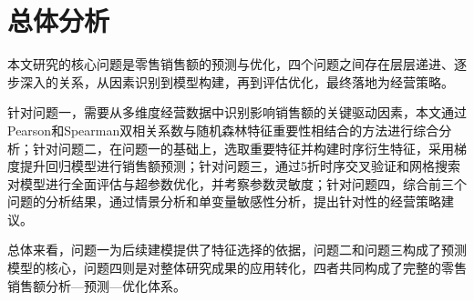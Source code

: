 
\section{总体分析}

本文研究的核心问题是零售销售额的预测与优化，四个问题之间存在层层递进、逐步深入的关系，从因素识别到模型构建，再到评估优化，最终落地为经营策略。

针对问题一，需要从多维度经营数据中识别影响销售额的关键驱动因素，本文通过Pearson和Spearman双相关系数与随机森林特征重要性相结合的方法进行综合分析；针对问题二，在问题一的基础上，选取重要特征并构建时序衍生特征，采用梯度提升回归模型进行销售额预测；针对问题三，通过5折时序交叉验证和网格搜索对模型进行全面评估与超参数优化，并考察参数灵敏度；针对问题四，综合前三个问题的分析结果，通过情景分析和单变量敏感性分析，提出针对性的经营策略建议。

总体来看，问题一为后续建模提供了特征选择的依据，问题二和问题三构成了预测模型的核心，问题四则是对整体研究成果的应用转化，四者共同构成了完整的零售销售额分析—预测—优化体系。
